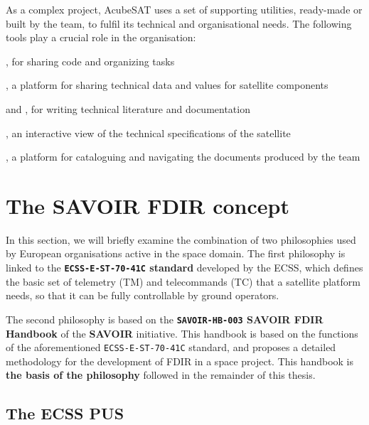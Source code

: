 \documentclass[a4paper,nobib]{tufte-book}
\begin{document}
As a complex project, AcubeSAT uses a set of supporting utilities, ready-made or built by the team, to fulfil its technical and organisational needs. The following tools play a crucial role in the organisation:
\begin{compactitem}
	\item {}, for sharing code and organizing tasks
	\item {}, a platform for sharing technical data and values for satellite components
	\item {} and , for writing technical literature and documentation
	\item {}, an interactive view of the technical specifications of the satellite
	\item {}, a platform for cataloguing and navigating the documents produced by the team
\end{compactitem}

\chapter{The SAVOIR \ac{FDIR} concept}
\label{cap:savoir}

In this section, we will briefly examine the combination of two philosophies used by European organisations active in the space domain. The first philosophy is linked to the \textbf{\texttt{ECSS-E-ST-70-41C} standard} \autocite{ECSS-E-ST-70-41C} developed by the \acf{ECSS}, which defines the basic set of telemetry (\acs{TM}) and telecommands (\acs{TC}) that a satellite platform needs, so that it can be fully controllable by ground operators.

The second philosophy is based on the \textbf{\texttt{SAVOIR-HB-003} \acs{SAVOIR} \acs{FDIR} Handbook} \autocite{SAVOIR-HB-003} of the \textbf{\acf{SAVOIR}} initiative. This handbook is based on the functions of the aforementioned \texttt{ECSS-E-ST-70-41C} standard, and proposes a detailed methodology for the development of \ac{FDIR} in a space project. This handbook is \textbf{the basis of the philosophy} followed in the remainder of this thesis.

\section{The \acs{ECSS} \acl{PUS}}
\label{sec:pus}
\end{document}
